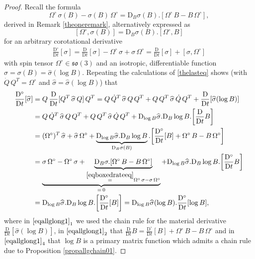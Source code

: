 \documentclass[10pt]{article}
\numberwithin{theoremCounter}{section}
\theoremstyle{plain}
\theoremstyle{definition}
\newcommand{\DD}{\mathrm{D}}
\numberwithin{equation}{section}
\begin{document}
\begin{proof}
Recall the formula
	\begin{equation}
	\label{eqboxedrateeq}
	\boxed{\Omega^{\circ} \, \sigma(B) - \sigma(B) \, \Omega^{\circ} = \DD_B\sigma(B).[\Omega^{\circ} \, B - B \, \Omega^{\circ}],}
	\end{equation}
derived in Remark \ref{theoneremark}, alternatively expressed as
	\begin{equation}
	\boxed{[\Omega^{\circ}, \sigma(B)] = \DD_B \sigma(B).[\Omega^{\circ},B]}
	\end{equation}
for an arbitrary corotational derivative
	\begin{align}
	\frac{\DD^{\circ}}{\DD t}[\sigma] = \frac{\DD}{\DD t}[\sigma] - \Omega^{\circ} \, \sigma + \sigma \, \Omega^{\circ} = \frac{\DD}{\DD t}[\sigma] + [\sigma, \Omega^{\circ}]
	\end{align}
with spin tensor $\Omega^{\circ} \in \mathfrak{so}(3)$ and an isotropic, differentiable function $\sigma = \sigma(B) = \widehat \sigma(\log B)$. Repeating the calculations of \eqref{thelasteq} shows (with $\dot Q \, Q^T = \Omega^{\circ}$ and $\widehat \sigma = \widehat \sigma(\log B)$) that
	\begin{equation}
	\label{eqallglong1}
	\begin{alignedat}{2}
	\frac{\DD^{\circ}}{\DD t}[\widehat \sigma] &= Q \, \frac{\DD}{\DD t}[Q^T \, \widehat \sigma \, Q] \, Q^T = Q \, \dot{Q}^T \, \widehat \sigma \, Q \, Q^T + Q \, Q^T \, \widehat \sigma \, \dot{Q} \, Q^T + \frac{\DD}{\DD t}[\widehat \sigma(\log B)] \\
	&= Q \, \dot{Q}^T \, \widehat \sigma \, Q \, Q^T + Q \, Q^T \, \widehat \sigma \, \dot{Q} \, Q^T + \DD_{\log B} \widehat \sigma . \DD_B \log B.\!\left[\frac{\DD}{\DD t} B\right] \\
	&= (\Omega^{\circ})^T \, \widehat \sigma + \widehat \sigma \, \Omega^{\circ} + \underbrace{\DD_{\log B} \widehat \sigma . \DD_B \log B}_{\DD_B \sigma(B)}.\!\left[\frac{\DD^{\circ}}{\DD t}[B] + \Omega^{\circ} \, B - B \, \Omega^{\circ} \right] \\
	&= \underbrace{\sigma \, \Omega^{\circ} - \Omega^{\circ} \, \sigma + \underbrace{\DD_B \sigma.[\Omega^{\circ} \, B - B \, \Omega^{\circ}]}_{\overset{\eqref{eqboxedrateeq}}{=} \Omega^{\circ} \, \sigma - \sigma \, \Omega^{\circ}}}_{= \, 0} + \DD_{\log B} \widehat \sigma . \DD_B \log B.\!\left[\frac{\DD^{\circ}}{\DD t} B \right] \\
	&= \DD_{\log B} \widehat \sigma . \DD_B \log B.\!\left[\frac{\DD^{\circ}}{\DD t}[B]\right] = \DD_{\log B} \widehat \sigma(\log B) . \frac{\DD^{\circ}}{\DD t}[\log B],
	\end{alignedat}
	\end{equation}
where in $\eqref{eqallglong1}_1$ we used the chain rule for the material derivative $\frac{\DD}{\DD t}[\widehat \sigma(\log B)]$, in $\eqref{eqallglong1}_2$ that \break $\frac{\DD}{\DD t} B = \frac{\DD^{\circ}}{\DD t}[B] + \Omega^{\circ} \, B - B \, \Omega^{\circ}$ and in $\eqref{eqallglong1}_4$ that $\log B$ is a primary matrix function which admits a chain rule due to Proposition \ref{propallgchain01}. 
\end{proof}
\end{document}
